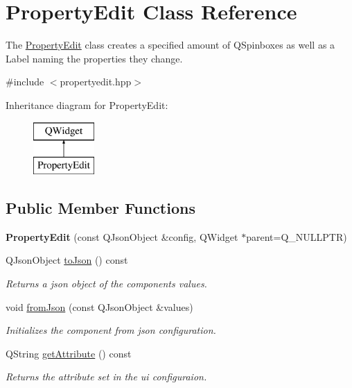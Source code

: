 \hypertarget{class_property_edit}{}\section{Property\+Edit Class Reference}
\label{class_property_edit}


The \mbox{\hyperlink{class_property_edit}{Property\+Edit}} class creates a specified amount of Q\+Spinboxes as well as a Label naming the properties they change.  




{\ttfamily \#include $<$propertyedit.\+hpp$>$}

Inheritance diagram for Property\+Edit\+:\begin{figure}[H]
\begin{center}
\leavevmode
\includegraphics[height=2.000000cm]{class_property_edit}
\end{center}
\end{figure}
\subsection*{Public Member Functions}
\begin{DoxyCompactItemize}
\item 
\mbox{\label{class_property_edit_a9faa7e41a8409ccc727d8c96e92e86e5}} 
{\bfseries Property\+Edit} (const Q\+Json\+Object \&config, Q\+Widget $\ast$parent=Q\+\_\+\+N\+U\+L\+L\+P\+TR)
\item 
Q\+Json\+Object \mbox{\hyperlink{class_property_edit_a94cdfb72670c88ca66a29b4a62632c8a}{to\+Json}} () const
\begin{DoxyCompactList}\small\item\em Returns a json object of the components values. \end{DoxyCompactList}\item 
void \mbox{\hyperlink{class_property_edit_a5c708a29919c4452d7f34321f38a572e}{from\+Json}} (const Q\+Json\+Object \&values)
\begin{DoxyCompactList}\small\item\em Initializes the component from json configuration. \end{DoxyCompactList}\item 
Q\+String \mbox{\hyperlink{class_property_edit_a44ce9e0c1a30c7d6a2819740613d05c0}{get\+Attribute}} () const
\begin{DoxyCompactList}\small\item\em Returns the attribute set in the ui configuraion. \end{DoxyCompactList}\end{DoxyCompactItemize}


